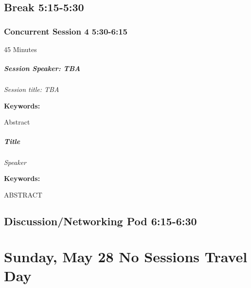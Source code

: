 \documentclass[
]{book}
\begin{document}
\hypertarget{break-515-530}{%
\section*{Break \textbar{} 5:15-5:30}\label{break-515-530}}

\hypertarget{concurrent-session-4-530-615}{%
\subsection*{Concurrent Session 4 \textbar{} 5:30-6:15}\label{concurrent-session-4-530-615}}

45 Minutes

\begin{speaker}
\hypertarget{session-speaker-tba}{%
\paragraph{\texorpdfstring{Session Speaker:
\textbf{TBA}}{Session Speaker: TBA}}\label{session-speaker-tba}}

\emph{Session title: TBA}

\textbf{Keywords:}

Abstract
\end{speaker}

\begin{speaker}
\hypertarget{title}{%
\paragraph{\texorpdfstring{\textbf{Title}}{Title}}\label{title}}

\emph{Speaker}

\textbf{Keywords:}

ABSTRACT
\end{speaker}

\hypertarget{discussionnetworking-pod-615-630}{%
\section*{Discussion/Networking Pod \textbar{} 6:15-6:30}\label{discussionnetworking-pod-615-630}}

\hypertarget{sunday-may-28-no-sessions-travel-day}{%
\chapter{Sunday, May 28 \textbar{} No Sessions Travel Day}\label{sunday-may-28-no-sessions-travel-day}}
\end{document}
